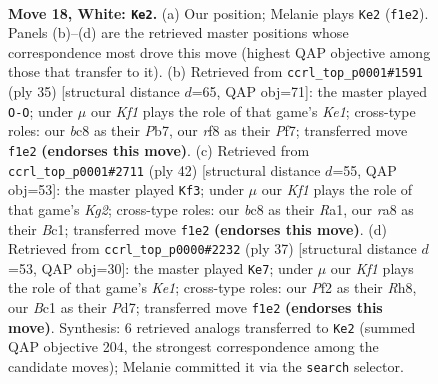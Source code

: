 \documentclass[11pt]{article}
\begin{document}
\clearpage

\begin{figure}[p]\centering
\begin{subfigure}{0.46\textwidth}\centering
\resizebox{\linewidth}{!}{%
\newchessgame
\chessboard[
  setfen={r1b2r2/pp4kp/6p1/2pBbp1n/7P/4P1P1/PP1P1P2/RNB1RK2 w - - 1 18},
  showmover=false,
  pgfstyle=straightmove, color=movearrow, markmove={f1-e2}
]}
\caption{}
\end{subfigure}\hfill
\begin{subfigure}{0.46\textwidth}\centering
\resizebox{\linewidth}{!}{%
\newchessgame
\chessboard[
  setfen={4k2r/1p3pp1/p1n5/2brp2p/3p3P/P2B1PB1/1PPR1P2/2K1R3 b k - 1 18},
  showmover=false,
  pgfstyle=straightmove, color=movearrow, markmove={e8-g8}
]}
\caption{}
\end{subfigure}
\\[4pt]
\begin{subfigure}{0.46\textwidth}\centering
\resizebox{\linewidth}{!}{%
\newchessgame
\chessboard[
  setfen={r2r1bk1/pp3ppp/2p1pn2/8/2BP1P2/PP2P1P1/6KP/R1BR4 w - - 1 22},
  showmover=false,
  pgfstyle=straightmove, color=movearrow, markmove={g2-f3}
]}
\caption{}
\end{subfigure}\hfill
\begin{subfigure}{0.46\textwidth}\centering
\resizebox{\linewidth}{!}{%
\newchessgame
\chessboard[
  setfen={r3k2r/3p1p2/p1b1p1n1/bp2P3/7p/2NB1P1P/PPP3PB/R3R1K1 b kq - 0 19},
  showmover=false,
  pgfstyle=straightmove, color=movearrow, markmove={e8-e7}
]}
\caption{}
\end{subfigure}
\caption{\textbf{Move 18, White: \texttt{Ke2}.} (a) Our position; Melanie plays \texttt{Ke2} (\texttt{f1e2}). Panels (b)--(d) are the retrieved master positions whose correspondence most drove this move (highest QAP objective among those that transfer to it). (b) Retrieved from \texttt{ccrl\_top\_p0001\#1591} (ply 35) [structural distance $d$=65, QAP obj=71]: the master played \texttt{O-O}; under $\mu$ our \emph{Kf1} plays the role of that game's \emph{Ke1}; cross-type roles: our \emph{b}c8 as their \emph{P}b7, our \emph{r}f8 as their \emph{P}f7; transferred move \texttt{f1e2} \textbf{(endorses this move)}. (c) Retrieved from \texttt{ccrl\_top\_p0001\#2711} (ply 42) [structural distance $d$=55, QAP obj=53]: the master played \texttt{Kf3}; under $\mu$ our \emph{Kf1} plays the role of that game's \emph{Kg2}; cross-type roles: our \emph{b}c8 as their \emph{R}a1, our \emph{r}a8 as their \emph{B}c1; transferred move \texttt{f1e2} \textbf{(endorses this move)}. (d) Retrieved from \texttt{ccrl\_top\_p0000\#2232} (ply 37) [structural distance $d$=53, QAP obj=30]: the master played \texttt{Ke7}; under $\mu$ our \emph{Kf1} plays the role of that game's \emph{Ke1}; cross-type roles: our \emph{P}f2 as their \emph{R}h8, our \emph{B}c1 as their \emph{P}d7; transferred move \texttt{f1e2} \textbf{(endorses this move)}. Synthesis: 6 retrieved analogs transferred to \texttt{Ke2} (summed QAP objective 204, the strongest correspondence among the candidate moves); Melanie committed it via the \texttt{search} selector.}
\label{fig:thought-m34}
\end{figure}
\end{document}
